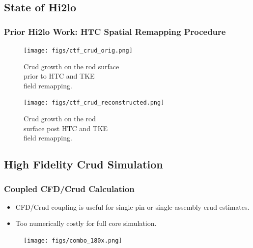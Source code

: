\documentclass[t, pdftex]{beamer}
\begin{document}
\subsection*{State of Hi2lo}
\begin{frame}
\frametitle{Prior Hi2lo Work: HTC Spatial Remapping Procedure}
\begin{figure}[!htbp]
\centering
\begin{minipage}{.5\textwidth}
    \texttt{[image: figs/ctf\_crud\_orig.png]}
    \caption{\centering \scriptsize{ Crud growth on the rod surface \\ prior to HTC and TKE \\ field remapping.}}
    \label{fig:crud_pre_map}
\end{minipage}%
\begin{minipage}{.5\textwidth}
    \vspace{-5pt}
    \texttt{[image: figs/ctf\_crud\_reconstructed.png]}
    \caption{\centering \scriptsize Crud growth on the rod \\ surface post HTC and TKE \\ field remapping.}
    \label{fig:crud_post_map}
\end{minipage}
\end{figure}
\cite{salko17}
\end{frame}

\subsection*{High Fidelity Crud Simulation}
\begin{frame}
\frametitle{Coupled CFD/Crud Calculation}
\vspace{-18pt}
\scriptsize{
    \begin{itemize}
    \item CFD/Crud coupling is useful for single-pin or single-assembly crud estimates.
    \item Too numerically costly for full core simulation.
    \end{itemize}
}
\begin{figure}[]
\centering
\texttt{[image: figs/combo\_180x.png]}
\label{cfd_crud}
\end{figure}
\cite{slattery16}
\end{frame}
\end{document}
